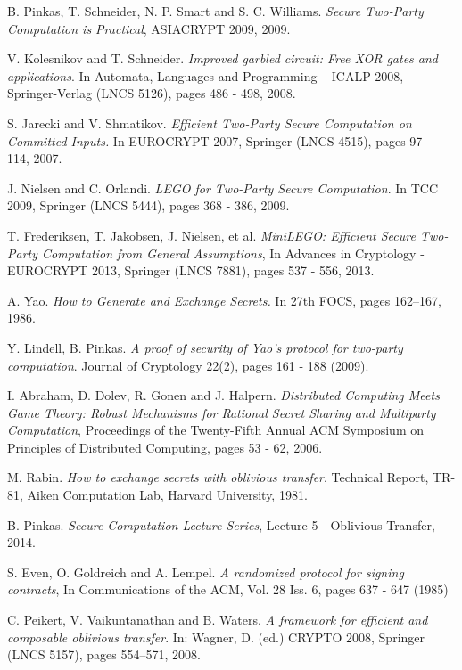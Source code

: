 \documentclass[ %
                    author={Nicholas Tutte},
                supervisor={Prof. Nigel Smart},
                    degree={MEng},
                     title={Secure Two Party Computation},
                  subtitle={A practical comparison of recent protocols},
                      type={Research - GG1K},
                      year={2015} ]{dissertation}
\begin{document}
\begin{thebibliography}{99}
			
			B. Pinkas, T. Schneider, N. P. Smart and S. C. Williams.
			\emph{Secure Two-Party Computation is Practical},
			ASIACRYPT 2009, 2009.

			V. Kolesnikov and T. Schneider.
			\emph{Improved garbled circuit: Free XOR gates and applications}.
			In Automata, Languages and Programming – ICALP 2008, Springer-Verlag (LNCS 5126),
			pages 486 - 498,
			2008.

			S. Jarecki and V. Shmatikov.
			\emph{Efficient Two-Party Secure Computation on Committed Inputs.}
			In EUROCRYPT 2007, Springer (LNCS 4515),
			pages 97 - 114,
			2007.

			J. Nielsen and C. Orlandi. \emph{LEGO for Two-Party Secure Computation}. In TCC 2009, Springer (LNCS 5444), pages 368 - 386, 2009.

			T. Frederiksen, T. Jakobsen, J. Nielsen, et al. \emph{MiniLEGO: Efficient Secure Two-Party Computation from General Assumptions}, In Advances in Cryptology - EUROCRYPT 2013, Springer (LNCS 7881), pages 537 - 556, 2013.

			A. Yao. \emph{How to Generate and Exchange Secrets.} In 27th FOCS, pages 162–167, 1986.

			Y. Lindell, B. Pinkas. \emph{A proof of security of Yao’s protocol for two-party computation}. Journal of Cryptology 22(2), pages 161 - 188 (2009).

			I. Abraham, D. Dolev, R. Gonen and J. Halpern. \emph{Distributed Computing Meets Game Theory: Robust Mechanisms for Rational Secret Sharing and Multiparty Computation}, Proceedings of the Twenty-Fifth Annual ACM Symposium on Principles of Distributed Computing,  pages 53 - 62, 2006.

			M. Rabin. \emph{How to exchange secrets with oblivious transfer}. Technical Report, TR-81, Aiken Computation Lab, Harvard University, 1981.

			B. Pinkas. \emph{Secure Computation Lecture Series}, Lecture 5 - Oblivious Transfer, 2014.

			S. Even, O. Goldreich and A. Lempel. \emph{A randomized protocol for signing contracts}, In Communications of the ACM, Vol. 28 Iss. 6, pages 637 - 647 (1985)

			C. Peikert, V. Vaikuntanathan and B. Waters. \emph{A framework for efficient and composable oblivious transfer}. In: Wagner, D. (ed.) CRYPTO 2008, Springer (LNCS 5157), pages 554–571, 2008.


\end{thebibliography}
\end{document}
